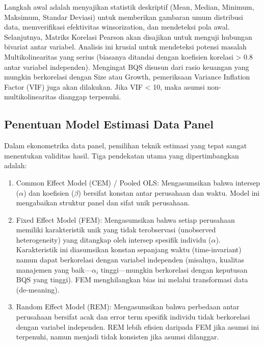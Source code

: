 \documentclass[12pt,a4paper]{report}
\providecommand{\tightlist}{%
  \setlength{\itemsep}{0pt}\setlength{\parskip}{0pt}%
}
\begin{document}
Langkah awal adalah menyajikan statistik deskriptif (Mean, Median,
Minimum, Maksimum, Standar Deviasi) untuk memberikan gambaran umum
distribusi data, memverifikasi efektivitas winsorization, dan mendeteksi
pola awal. Selanjutnya, Matriks Korelasi Pearson akan disajikan untuk
menguji hubungan bivariat antar variabel. Analisis ini krusial untuk
mendeteksi potensi masalah Multikolinearitas yang serius (biasanya
ditandai dengan koefisien korelasi \textgreater{} 0.8 antar variabel
independen). Mengingat BQS disusun dari rasio keuangan yang mungkin
berkorelasi dengan Size atau Growth, pemeriksaan Variance Inflation
Factor (VIF) juga akan dilakukan. Jika VIF \textless{} 10, maka asumsi
non-multikolinearitas dianggap terpenuhi.

\hypertarget{penentuan-model-estimasi-data-panel}{%
\subsection{Penentuan Model Estimasi Data
Panel}\label{penentuan-model-estimasi-data-panel}}

Dalam ekonometrika data panel, pemilihan teknik estimasi yang tepat
sangat menentukan validitas hasil. Tiga pendekatan utama yang
dipertimbangkan adalah:

\begin{enumerate}
\def\labelenumi{\arabic{enumi}.}
\tightlist
\item
  Common Effect Model (CEM) / Pooled OLS: Mengasumsikan bahwa intersep
  (\(\alpha\)) dan koefisien (\(\beta\)) bersifat konstan antar
  perusahaan dan waktu. Model ini mengabaikan struktur panel dan sifat
  unik perusahaan.
\item
  Fixed Effect Model (FEM): Mengasumsikan bahwa setiap perusahaan
  memiliki karakteristik unik yang tidak terobservasi (unobserved
  heterogeneity) yang ditangkap oleh intersep spesifik individu
  (\(\alpha\)). Karakteristik ini diasumsikan konstan sepanjang waktu
  (time-invariant) namun dapat berkorelasi dengan variabel independen
  (misalnya, kualitas manajemen yang baik---\(\alpha_i\)
  tinggi---mungkin berkorelasi dengan keputusan BQS yang tinggi). FEM
  menghilangkan bias ini melalui transformasi data (de-meaning).
\item
  Random Effect Model (REM): Mengasumsikan bahwa perbedaan antar
  perusahaan bersifat acak dan error term spesifik individu tidak
  berkorelasi dengan variabel independen. REM lebih efisien daripada FEM
  jika asumsi ini terpenuhi, namun menjadi tidak konsisten jika asumsi
  dilanggar.
\end{enumerate}
\end{document}
